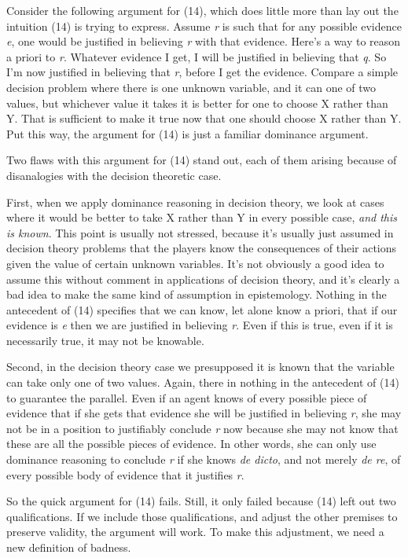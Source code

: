 Consider the following argument for (14), which does little more than
lay out the intuition (14) is trying to express. Assume \emph{r} is such
that for any possible evidence \emph{e}, one would be justified in
believing \emph{r} with that evidence. Here's a way to reason a priori
to \emph{r}. Whatever evidence I get, I will be justified in believing
that \emph{q}. So I'm now justified in believing that \emph{r}, before I
get the evidence. Compare a simple decision problem where there is one
unknown variable, and it can one of two values, but whichever value it
takes it is better for one to choose X rather than Y. That is sufficient
to make it true now that one should choose X rather than Y. Put this
way, the argument for (14) is just a familiar dominance argument.

Two flaws with this argument for (14) stand out, each of them arising
because of disanalogies with the decision theoretic case.

First, when we apply dominance reasoning in decision theory, we look at
cases where it would be better to take X rather than Y in every possible
case, \emph{and this is known}. This point is usually not stressed,
because it's usually just assumed in decision theory problems that the
players know the consequences of their actions given the value of
certain unknown variables. It's not obviously a good idea to assume this
without comment in applications of decision theory, and it's clearly a
bad idea to make the same kind of assumption in epistemology. Nothing in
the antecedent of (14) specifies that we can know, let alone know a
priori, that if our evidence is \emph{e} then we are justified in
believing \emph{r}. Even if this is true, even if it is necessarily
true, it may not be knowable.

Second, in the decision theory case we presupposed it is known that the
variable can take only one of two values. Again, there in nothing in the
antecedent of (14) to guarantee the parallel. Even if an agent knows of
every possible piece of evidence that if she gets that evidence she will
be justified in believing \emph{r}, she may not be in a position to
justifiably conclude \emph{r} now because she may not know that these
are all the possible pieces of evidence. In other words, she can only
use dominance reasoning to conclude \emph{r} if she knows \emph{de
dicto}, and not merely \emph{de re}, of every possible body of evidence
that it justifies \emph{r}.

So the quick argument for (14) fails. Still, it only failed because (14)
left out two qualifications. If we include those qualifications, and
adjust the other premises to preserve validity, the argument will work.
To make this adjustment, we need a new definition of badness.

